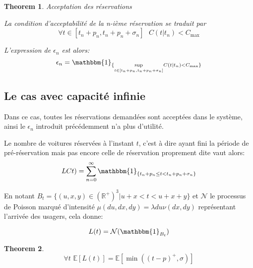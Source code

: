 \documentclass[12pt,a4paper]{article}
\newcommand{\E}[1]{\mathbb{E}\left[ #1 \right]}
\newcommand{\1}[1]{\mathbbm{1}_{\{#1\}} }
\newtheorem{theorem}{Theorem}
\theoremstyle{definition}
\begin{document}
{\begin{theorem}{Acceptation des réservations}

La condition d'acceptabilité de la n-ième réservation se traduit par
\begin{equation}
\forall t \in [t_n+p_n,t_n+p_n+\sigma_n]\,\,\,\, C(t|t_n) < C_{\max}
\end{equation}

L'expression de $\epsilon_n$ est alors:
\begin{equation}
\epsilon_n = \1{\underset{t \in [t_n+p_n,t_n+p_n+\sigma_n]}{\sup} C(t|t_n) < C_{\max}}
\end{equation}
\end{theorem}

\subsection{Le cas avec capacité infinie}

Dans ce cas, toutes les réservations demandées sont acceptées dans le système, ainsi le $\epsilon_n$ introduit précédemment n'a plus d'utilité.




Le nombre de voitures réservées à l'instant $t$, c'est à dire ayant fini la période de pré-réservation mais pas encore celle de réservation proprement dite vaut alors:
\begin{equation}
LCt) = \sum_{n=0}^{\infty} 	\mathbbm{1}_{\{t_n+p_n \leq t < t_n + p_n +\sigma_n\}}
\end{equation}

En notant $B_t = \{(u,x,y) \in \left(\mathbb{R}^+\right)^3  | u+x<t<u+x+y \} $ et $\mathcal{N}$ le processus de Poisson marqué d'intensité $\mu(du,dx,dy) = \lambda du \nu(dx,dy)$ représentant l'arrivée des usagers, cela donne:

\begin{equation}
L(t) = \mathcal{N}(\mathbbm{1}_{B_t})
\end{equation}



\begin{theorem} {}



\begin{equation}
\forall t\,\,\E{L(t)} = \E{\min((t-p)^+,\sigma)}	
\end{equation}

\end{theorem}

}
\end{document}
